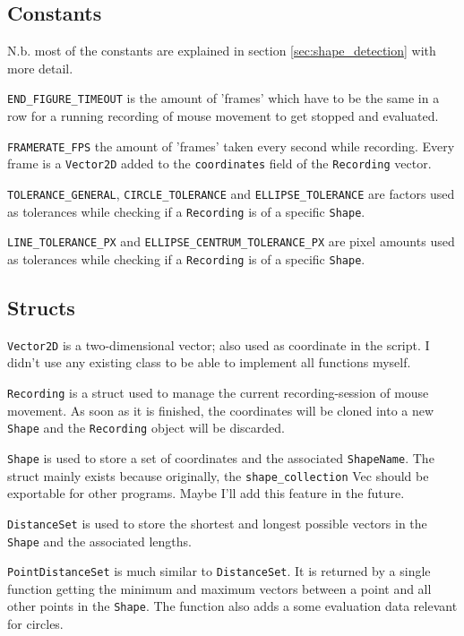 \documentclass[12pt, a4paper]{article}
\begin{document}
        \subsection{Constants}
            N.b. most of the constants are explained in section \ref{sec:shape_detection} with more detail.\hfill\break

            \texttt{END\_FIGURE\_TIMEOUT} is the amount of 'frames' which have to be the same in a row for a running recording of mouse movement to get stopped and evaluated.\hfill\break

            \texttt{FRAMERATE\_FPS} the amount of 'frames' taken every second while recording. Every frame is a \texttt{Vector2D} added to the \texttt{coordinates} field of the \texttt{Recording} vector.\hfill\break

            \texttt{TOLERANCE\_GENERAL}, \texttt{CIRCLE\_TOLERANCE} and \texttt{ELLIPSE\_TOLERANCE} are factors used as tolerances while checking if a \texttt{Recording} is of a specific \texttt{Shape}.\hfill\break

            \texttt{LINE\_TOLERANCE\_PX} and \texttt{ELLIPSE\_CENTRUM\_TOLERANCE\_PX} are pixel amounts used as tolerances while checking if a \texttt{Recording} is of a specific \texttt{Shape}.

        \subsection{Structs}
            \label{sec:structs}
            \texttt{Vector2D} is a two-dimensional vector; also used as coordinate in the script. I didn't use any existing class to be able to implement all functions myself.\hfill\break

            \texttt{Recording} is a struct used to manage the current recording-session of mouse movement. As soon as it is finished, the coordinates will be cloned into a new \texttt{Shape} and the \texttt{Recording} object will be discarded.\hfill\break

            \texttt{Shape} is used to store a set of coordinates and the associated \texttt{ShapeName}. The struct mainly exists because originally, the \texttt{shape\_collection} Vec should be exportable for other programs. Maybe I'll add this feature in the future.\hfill\break

            \texttt{DistanceSet} is used to store the shortest and longest possible vectors in the \texttt{Shape} and the associated lengths.\hfill\break

            \texttt{PointDistanceSet} is much similar to \texttt{DistanceSet}. It is returned by a single function getting the minimum and maximum vectors between a point and all other points in the \texttt{Shape}. The function also adds a some evaluation data relevant for circles.
\end{document}
